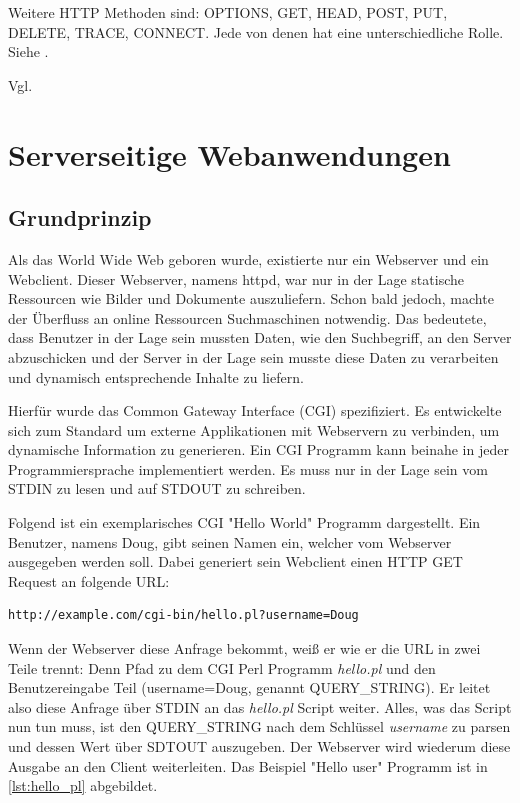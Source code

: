 Weitere HTTP Methoden sind: OPTIONS, GET, HEAD, POST, PUT, DELETE, TRACE, CONNECT. 
Jede von denen hat eine unterschiedliche Rolle. Siehe \cite[Kap. 4]{Fielding:2014}. 

Vgl. \cite{Dubost:2012}

\section{Serverseitige Webanwendungen}

\subsection{Grundprinzip}

Als das World Wide Web geboren wurde, existierte nur ein Webserver und ein Webclient. Dieser Webserver, namens httpd, war nur in der Lage statische Ressourcen wie Bilder und Dokumente auszuliefern. Schon bald jedoch, machte der Überfluss an online Ressourcen Suchmaschinen notwendig. Das bedeutete, dass Benutzer in der Lage sein mussten Daten, wie den Suchbegriff, an den Server abzuschicken und der Server in der Lage sein musste diese Daten zu verarbeiten und dynamisch entsprechende Inhalte zu liefern.

Hierfür wurde das Common Gateway Interface (CGI) spezifiziert. Es entwickelte sich zum Standard um externe Applikationen mit Webservern zu verbinden, um dynamische Information zu generieren. Ein CGI Programm kann beinahe in jeder Programmiersprache implementiert werden. Es muss nur in der Lage sein vom STDIN zu lesen und auf STDOUT zu schreiben.  

Folgend ist ein exemplarisches CGI "Hello World" Programm dargestellt. Ein Benutzer, namens Doug, gibt seinen Namen ein, welcher vom Webserver ausgegeben werden soll. Dabei generiert sein Webclient einen HTTP GET Request an folgende URL: 

\begin{verbatim}
http://example.com/cgi-bin/hello.pl?username=Doug
\end{verbatim}

Wenn der Webserver diese Anfrage bekommt, weiß er wie er die URL in zwei Teile trennt: Denn Pfad zu dem CGI Perl Programm \emph{hello.pl} und den Benutzereingabe Teil (username=Doug, genannt QUERY\_STRING). Er leitet also diese Anfrage über STDIN an das \emph{hello.pl} Script weiter. Alles, was das Script nun tun muss, ist den QUERY\_STRING nach dem Schlüssel \emph{username} zu parsen und dessen Wert über SDTOUT auszugeben. Der Webserver wird wiederum diese Ausgabe an den Client weiterleiten. Das Beispiel "Hello user" Programm ist in \ref{lst:hello_pl} abgebildet. 


